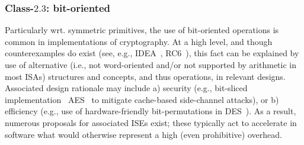 
\subsubsection{Class-$2.3$: bit-oriented}
\label{sec:spec:instruction:2:3}

Particularly wrt. symmetric primitives, the use of bit-oriented operations 
is common in implementations of cryptography.  At a high level, and though 
counterexamples do exist 
(see, e.g., IDEA~\cite{SCARV:LaiMas:90}, RC6~\cite{SCARV:RRSY:98}),
this fact can be explained by use of alternative (i.e., not word-oriented
and/or not supported by arithmetic in most ISAs) structures and concepts,
and thus operations, in relevant designs.  Associated design rationale may
include
a) security
   (e.g., bit-sliced implementation~\cite{SCARV:KasSch:09} AES~\cite{SCARV:FIPS:197} to mitigate cache-based side-channel attacks),
   or
b) efficiency
   (e.g., use of hardware-friendly bit-permutations in DES~\cite{SCARV:FIPS:46_3}).
As a result, numerous proposals for associated ISEs exist; these typically
act to accelerate in software what would otherwise represent a high (even 
prohibitive) overhead.  



